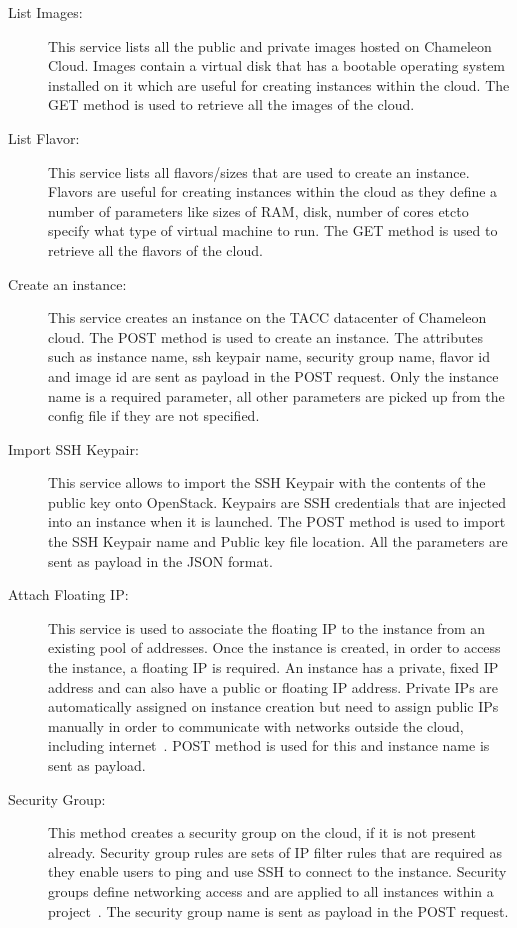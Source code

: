 \begin{description}
   \item[List Images:] This service lists all the public and private
   images hosted on Chameleon Cloud. Images contain a virtual disk that has a
   bootable operating system installed on it which are useful for creating
   instances within the cloud. The GET method is used to retrieve all the 
   images of the cloud. 

   \item[List Flavor:] This service lists all flavors/sizes that are
   used to create an instance. Flavors are useful for creating instances within
   the cloud as they define a number of parameters like sizes of RAM, disk,
   number of cores etc\. to specify what type of virtual machine to run. The 
   GET method is used to retrieve all the flavors of the cloud. 

   \item[Create an instance:] This service creates an instance on the
   TACC datacenter of Chameleon cloud. The POST method is used to create an
   instance. The attributes such as instance name, ssh keypair name, security
   group name, flavor id and image id are sent as payload in the POST request.
   Only the instance name is a required parameter, all other parameters are
   picked up from the config file if they are not specified. 

   \item[Import SSH Keypair:] This service allows to import the SSH
   Keypair with the contents of the public key onto OpenStack. Keypairs are SSH
   credentials that are injected into an instance when it is launched. The POST
   method is used to import the SSH Keypair name and Public key file location.
   All the parameters are sent as payload in the JSON format. 

   \item[Attach Floating IP:] This service is used to associate the
   floating IP to the instance from an existing pool of addresses. Once the
   instance is created, in order to access the instance, a floating IP is
   required. An instance has a private, fixed IP address and can also have a
   public or floating IP address. Private IPs are automatically assigned on
   instance creation but need to assign public IPs manually in order to
   communicate with networks outside the cloud, including
   internet~\cite{hid-sp18-516-www-manageips}. POST method is used for this 
   and instance name is sent as payload. 

   \item[Security Group:] This method creates a security group on the
   cloud, if it is not present already. Security group rules are sets of IP
   filter rules that are required as they enable users to ping and use SSH to
   connect to the instance. Security groups define networking access and are
   applied to all instances within a project~\cite{hid-sp18-516-www-secgroup}.
   The security group name is sent as payload in the POST request. 


\end{description}
